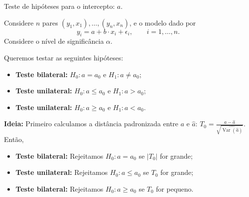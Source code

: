 \documentclass[8pt]{beamer}
\DeclareMathOperator{\vari}{Var}
\begin{document}
\begin{frame}{Teste de hipóteses para  o intercepto: $a$.}

Considere $n$ pares $(y_1, x_1), \dots, (y_n, x_n)$, e o modelo dado por
$$y_i = a + b \cdot x_i + \epsilon_i, \qquad i =1, \dots, n.$$
Considere o nível de significância $\alpha$.
\vfill

Queremos testar as seguintes hipóteses:
\begin{itemize}
	\item \textbf{Teste bilateral:} $H_0: a = a_0$ e $H_1: a \neq a_0$;
	\item \textbf{Teste unilateral:} $H_0: a \leq a_0$ e $H_1: a > a_0$;
	\item \textbf{Teste unilateral:} $H_0: a \geq a_0$ e $H_1: a < a_0$.
\end{itemize}
\vfill

\textbf{Ideia:} Primeiro calculamos a distância padronizada entre $a$ e $\hat{a}$: $T_0 = \frac{a - \hat{a}}{\sqrt{\widehat{\vari({\hat{a}})}}}$. Então,
\begin{itemize}
	\item \textbf{Teste bilateral:} Rejeitamos $H_0: a = a_0$ se $\lvert T_0 \rvert$ for grande;
	\item \textbf{Teste unilateral:} Rejeitamos $H_0: a \leq a_0$ se $ T_0 $ for grande;
	\item \textbf{Teste bilateral:} Rejeitamos $H_0: a \geq a_0$ se $T_0$ for pequeno.
\end{itemize}

\end{frame}
\end{document}
